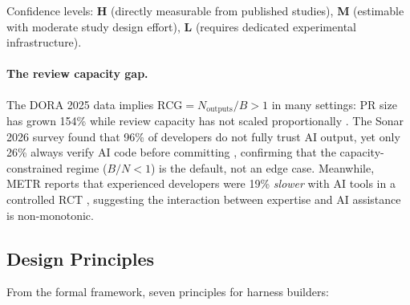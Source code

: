 Confidence levels: \textbf{H} (directly measurable from published studies), \textbf{M} (estimable with moderate study design effort), \textbf{L} (requires dedicated experimental infrastructure).

\paragraph{The review capacity gap.} The DORA 2025 data implies $\text{RCG} = N_{\text{outputs}} / B > 1$ in many settings: PR size has grown 154\% while review capacity has not scaled proportionally \citep{dora2025}. The Sonar 2026 survey found that 96\% of developers do not fully trust AI output, yet only 26\% always verify AI code before committing \citep{sonar2026}, confirming that the capacity-constrained regime ($B/N < 1$) is the default, not an edge case. Meanwhile, METR reports that experienced developers were 19\% \emph{slower} with AI tools in a controlled RCT \citep{metr2026}, suggesting the interaction between expertise and AI assistance is non-monotonic.

\subsection{Design Principles}

From the formal framework, seven principles for harness builders:

